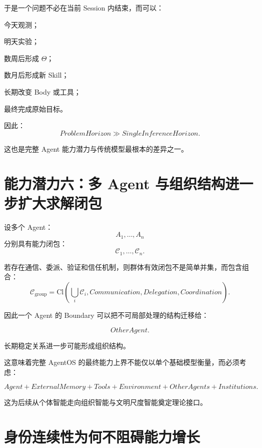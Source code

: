 于是一个问题不必在当前 Session 内结束，而可以：

今天观测；

明天实验；

数周后形成 $\Theta$；

数月后形成新 Skill；

长期改变 Body 或工具；

最终完成原始目标。

因此：
\begin{equation}
\boxed{
ProblemHorizon
\gg
SingleInferenceHorizon.
}
\end{equation}

这也是完整 Agent 能力潜力与传统模型最根本的差异之一。

\section{能力潜力六：多 Agent 与组织结构进一步扩大求解闭包}

设多个 Agent：
\begin{equation}
A_1,\ldots,A_n
\end{equation}
分别具有能力闭包：
\begin{equation}
\mathcal C_1,\ldots,\mathcal C_n.
\end{equation}

若存在通信、委派、验证和信任机制，则群体有效闭包不是简单并集，而包含组合：
\begin{equation}
\mathcal C_{\mathrm{group}}
=
\mathrm{Cl}
\left(
\bigcup_i
\mathcal C_i
,
Communication,
Delegation,
Coordination
\right).
\end{equation}

因此一个 Agent 的 Boundary 可以把不可局部处理的结构迁移给：

\begin{equation}
OtherAgent.
\end{equation}

长期稳定关系进一步可能形成组织结构。

这意味着完整 AgentOS 的最终能力上界不能仅以单个基础模型衡量，而必须考虑：

\begin{equation}
\boxed{
Agent
+
ExternalMemory
+
Tools
+
Environment
+
OtherAgents
+
Institutions.
}
\end{equation}

这为后续从个体智能走向组织智能与文明尺度智能奠定理论接口。

\section{身份连续性为何不阻碍能力增长}

